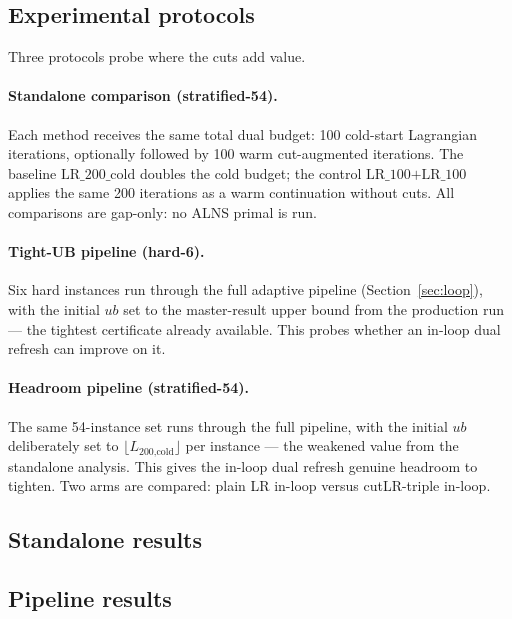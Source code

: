 \documentclass[11pt,a4paper]{article}
\begin{document}
\subsection{Experimental protocols}\label{sec:cutlr-design}

Three protocols probe where the cuts add value.

\paragraph{Standalone comparison (stratified-54).}
Each method receives the same total dual budget: 100 cold-start Lagrangian
iterations, optionally followed by 100 warm cut-augmented iterations.
The baseline $\text{LR\_200\_cold}$ doubles the cold budget; the control
$\text{LR\_100{+}LR\_100}$ applies the same 200 iterations as a warm
continuation without cuts.  All comparisons are gap-only: no ALNS primal
is run.

\paragraph{Tight-UB pipeline (hard-6).}
Six hard instances run through the full adaptive pipeline
(Section~\ref{sec:loop}), with the initial $ub$ set to the master-result
upper bound from the production run --- the tightest certificate already
available.  This probes whether an in-loop dual refresh can improve on it.

\paragraph{Headroom pipeline (stratified-54).}
The same 54-instance set runs through the full pipeline, with the initial
$ub$ deliberately set to $\lfloor L_{\text{200,cold}}\rfloor$ per instance ---
the weakened value from the standalone analysis.  This gives the in-loop dual
refresh genuine headroom to tighten.  Two arms are compared: plain LR in-loop
versus cutLR-triple in-loop.

\subsection{Standalone results}\label{sec:cutlr-standalone}



\subsection{Pipeline results}\label{sec:cutlr-pipeline}
\end{document}
